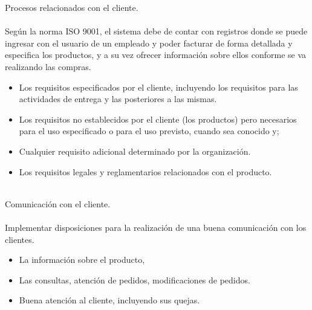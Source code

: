 \documentclass[12pt,a4paper]{article}
\begin{document}
Procesos relacionados con el cliente.\\\\
Según la norma ISO 9001, el sistema debe de contar con registros donde se puede ingresar con el usuario de un empleado y poder facturar de forma detallada y especifica los productos, y a su vez ofrecer información sobre ellos conforme se va realizando las compras.
\begin{itemize}
\item Los requisitos especificados por el cliente, incluyendo los requisitos para las actividades de entrega y las posteriores a las mismas.
\item Los requisitos no establecidos por el cliente (los productos) pero necesarios para el uso especificado o para el uso previsto, cuando sea conocido y;
\item Cualquier requisito adicional determinado por la organización.
\item Los requisitos legales y reglamentarios relacionados con el producto.\\\\
\end{itemize}


Comunicación con el cliente.\\\\
Implementar disposiciones para la realización de una buena comunicación con  los clientes.
\begin{itemize}
\item La información sobre el producto,
\item Las consultas, atención de pedidos, modificaciones de pedidos.
\item Buena atención al cliente, incluyendo sus quejas.\\\\
\end{itemize}
\end{document}
